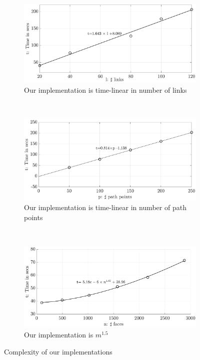 \documentclass[12pt,a4]{article}
\begin{document}
 \begin{figure}
\centering
 \begin{subfigure}{0.9\textwidth}
 \centering
 \includegraphics[width=0.8\linewidth]{figures/link_complexity.pdf}
 \caption{Our implementation is time-linear in number of links}
 \label{fig:link_complexity}
\end{subfigure}%
\\
\begin{subfigure}{0.9\textwidth}
\centering
 \includegraphics[width=0.8\linewidth]{figures/path_complexity.pdf}
\caption{Our implementation is time-linear in number of path points}
\label{fig:path_complexity}
\end{subfigure}%
\\
\begin{subfigure}{0.9\textwidth}
\centering
 \includegraphics[width=0.8\linewidth]{figures/face_complexity.pdf}
\caption{Our implementation is $m^{1.5}$}
\label{fig:face_complexity}
\end{subfigure}%

\caption{ Complexity of our implementations}
\label{fig:complexity}
\end{figure}
 
\end{document}
